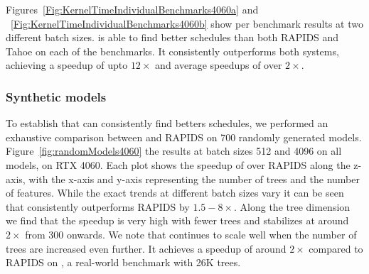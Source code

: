 
Figures~\ref{Fig:KernelTimeIndividualBenchmarks4060a} and ~\ref{Fig:KernelTimeIndividualBenchmarks4060b} 
show per benchmark results at two different batch sizes. 
\Treebeard{} is able to find better schedules than both RAPIDS and Tahoe on each of the benchmarks. It consistently
outperforms both systems, achieving a speedup of upto $12\times$ and average speedups of over $2\times$.

\subsubsection*{Synthetic models}
To establish that \Treebeard{} can consistently find betters schedules, we performed an exhaustive comparison between \Treebeard{} and RAPIDS on 700 randomly generated models.   
Figure~\ref{fig:randomModels4060} the results at batch sizes 512 and 4096 on all models, on RTX 4060. 
Each plot shows the speedup of \Treebeard{} over RAPIDS along the z-axis, with the x-axis and y-axis representing the number of trees and the number of features. 
While the exact trends at different batch sizes vary it can be seen that \Treebeard{} consistently outperforms RAPIDS by $1.5-8\times$. Along the tree 
dimension we find that the speedup is very high with fewer trees and stabilizes at around $2\times$ from 300 onwards. We note that \Treebeard{} continues to scale well 
when the number of trees are increased even further. It achieves a speedup of around $2\times$ compared to RAPIDS on , a real-world benchmark
with 26K trees.

